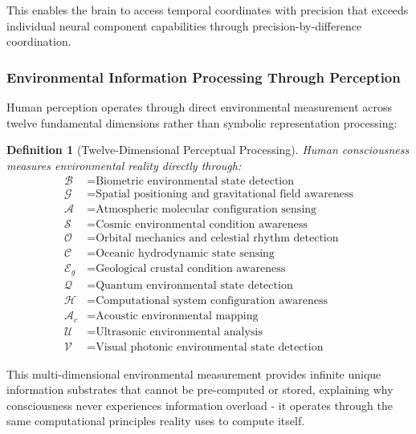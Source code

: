 \documentclass[12pt,a4paper]{article}
\newtheorem{definition}{Definition}
\begin{document}
This enables the brain to access temporal coordinates with precision that exceeds individual neural component capabilities through precision-by-difference coordination.

\subsubsection{Environmental Information Processing Through Perception}

Human perception operates through direct environmental measurement across twelve fundamental dimensions rather than symbolic representation processing:

\begin{definition}[Twelve-Dimensional Perceptual Processing]
Human consciousness measures environmental reality directly through:
\begin{align}
\mathcal{B} &= \text{Biometric environmental state detection} \\
\mathcal{G} &= \text{Spatial positioning and gravitational field awareness} \\
\mathcal{A} &= \text{Atmospheric molecular configuration sensing} \\
\mathcal{S} &= \text{Cosmic environmental condition awareness} \\
\mathcal{O} &= \text{Orbital mechanics and celestial rhythm detection} \\
\mathcal{C} &= \text{Oceanic hydrodynamic state sensing} \\
\mathcal{E}_g &= \text{Geological crustal condition awareness} \\
\mathcal{Q} &= \text{Quantum environmental state detection} \\
\mathcal{H} &= \text{Computational system configuration awareness} \\
\mathcal{A}_c &= \text{Acoustic environmental mapping} \\
\mathcal{U} &= \text{Ultrasonic environmental analysis} \\
\mathcal{V} &= \text{Visual photonic environmental state detection}
\end{align}
\end{definition}

This multi-dimensional environmental measurement provides infinite unique information substrates that cannot be pre-computed or stored, explaining why consciousness never experiences information overload - it operates through the same computational principles reality uses to compute itself.
\end{document}
